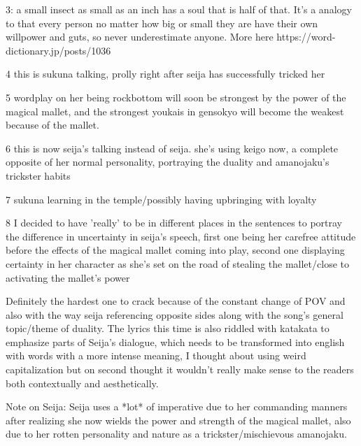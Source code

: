 {3}: a small insect as small as an inch has a soul that is half of that. It's a analogy to that every person no matter how big or small they are have their own willpower and guts, so never underestimate anyone. More here https://word-dictionary.jp/posts/1036

{4} this is sukuna talking, prolly right after seija has successfully tricked her

{5} wordplay on her being rockbottom will soon be strongest by the power of the magical mallet, and the strongest youkais in gensokyo will become the weakest because of the mallet.

{6} this is now seija's talking instead of seija. she's using keigo now, a complete opposite of her normal personality, portraying the duality and amanojaku's trickster habits

{7} sukuna learning in the temple/possibly having upbringing with loyalty

{8} I decided to have 'really' to be in different places in the sentences to portray the difference in uncertainty in seija's speech, first one being her carefree attitude before the effects of the magical mallet coming into play, second one displaying certainty in her character as she's set on the road of stealing the mallet/close to activating the mallet's power

Definitely the hardest one to crack because of the constant change of POV and also with the way seija referencing opposite sides along with the song's general topic/theme of duality. The lyrics this time is also riddled with katakata to emphasize parts of Seija's dialogue, which needs to be transformed into english with words with a more intense meaning, I thought about using weird capitalization but on second thought it wouldn't really make sense to the readers both contextually and aesthetically.

Note on Seija: Seija uses a *lot* of imperative due to her commanding manners after realizing she now wields the power and strength of the magical mallet, also due to her rotten personality and nature as a trickster/mischievous amanojaku.

